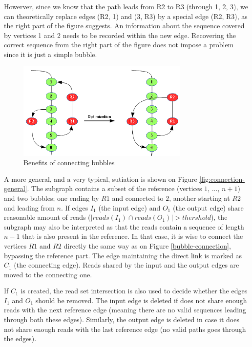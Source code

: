 Howerver, since we know that the path leads from R2 to R3 (through 1, 2, 3), we can theoretically replace edges (R2, 1) and (3, R3) by a special edge (R2, R3), as the right part of the figure suggests. An information about the sequence covered by vertices 1 and 2 needs to be recorded within the new edge. Recovering the correct sequence from the right part of the figure does not impose a problem since it is just a simple bubble. 

\begin{figure}
	\centering
	\includegraphics{img/bubble-connection.pdf}
	\caption{Benefits of connecting bubbles}
	\label{fig:bubble-connection}
\end{figure}

A more general, and a very typical, sutiation is shown on Figure \ref{fig:connection-general}. The subgraph contains a subset of the reference (vertices $1$, $...$, $n+1$) and two bubbles; one ending by $R1$ and connected to $2$, another starting at $R2$ and leading from $n$. If edges $I_1$ (the input edge) and $O_1$ (the output edge) share reasonable amount of reads ($|reads(I_1) \cap reads(O_1)| > thershold$), the subgraph may also be interpreted as that the reads contain a sequence of length $n-1$ that is also present in the reference. In that case, it is wise to connect the vertices $R1$ and $R2$ directly the same way as on Figure \ref{bubble-connection}, bypassing the reference part. The edge maintaining the direct link is marked as $C_1$ (the connecting edge). Reads shared by the input and the output edges are moved to the connecting one.

If $C_1$ is created, the read set intersection is also used to decide whether the edges $I_1$ and $O_1$ should be removed. The input edge is deleted if does not share enough reads with the next reference edge (meaning there are no valid sequences leading through both these edges). Similarly, the output edge is deleted in case it does not share enough reads with the last reference edge (no valid paths goes through the edges).

